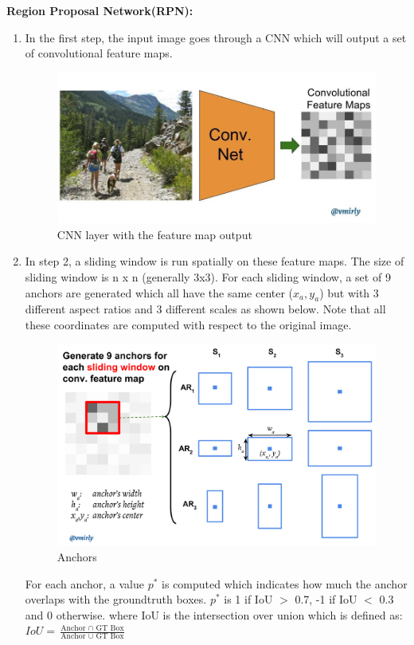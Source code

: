 \documentclass[12pt]{article}
\begin{document}
\textbf{Region Proposal Network(RPN): }
\begin{enumerate}
	\item In the first step, the input image goes through a CNN which will output a set of convolutional feature maps. \begin{figure}[H]
\centering
  \includegraphics[width=0.5\linewidth]{./Images/RPN1.jpeg}
  \caption{CNN layer with the feature map output}
  \label{fig:RPN1}
\end{figure}
	
	\item In step 2, a sliding window is run spatially on these feature maps. The size of sliding window is n x n (generally 3x3). For each sliding window, a set of 9 anchors are generated which all have the same center ($x_a,y_a$) but with 3 different aspect ratios and 3 different scales as shown below. Note that all these coordinates are computed with respect to the original image.
\begin{figure}[H]
\centering
  \includegraphics[width=0.5\linewidth]{./Images/RPN2.png}
  \caption{Anchors}
  \label{fig:RPN2}
\end{figure}

For each anchor, a value $p^*$ is computed which indicates how much the anchor overlaps with the groundtruth boxes. $p^*$ is 1 if IoU $>$ 0.7, -1 if IoU $<$ 0.3 and 0 otherwise.
where IoU is the intersection over union which is defined as: $IoU = \frac{\text{Anchor $\cap$ GT Box}}{\text{Anchor $\cup$ GT Box}}$ 


\end{enumerate}
\end{document}
